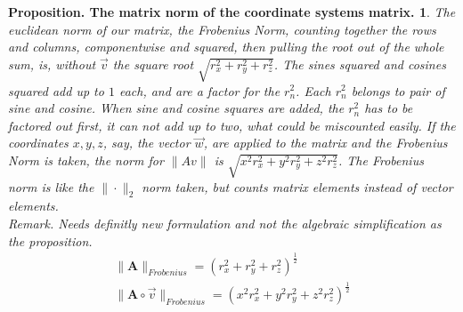 \documentclass[a4paper]{article}
\begin{document}
\newtheorem{PropositionMatrixNorm}{Proposition. The matrix norm of the coordinate systems matrix.}
\begin{PropositionMatrixNorm}
\label{proposition_matrix_norm}
The euclidean norm of our matrix, the Frobenius Norm, counting together the rows and columns, componentwise and squared, then pulling the root out of the whole sum, is, without $\vec{v}$ the square root $\sqrt{r_{x}^{2}+r_{y}^{2}+r_{z}^{2}}$. The sines squared and cosines squared add up to $1$ each, and are a factor for the $r_{n}^{2}$. Each $r_{n}^{2}$ belongs to pair of sine and cosine. When sine and cosine squares are added, the $r_{n}^{2}$ has to be factored out first, it can not add up to two, what could be miscounted easily. If the coordinates $x,y,z$, say, the vector $\vec{w}$, are applied to the matrix and the Frobenius Norm is taken, the norm for $\|Av\|$ is $\sqrt{x^{2}r_{x}^{2}+y^{2}r_{y}^{2}+z^{2}r_{z}^{2}}$. The Frobenius norm is like the $\|\cdot\|_{2}$ norm taken, but counts matrix elements instead of vector elements.\\

Remark. Needs definitly new formulation and not the algebraic simplification as the proposition.\\

\begin{displaymath}
\begin{align}
\|\boldsymbol{A}\|_{Frobenius} = (r_{x}^{2}+r_{y}^{2}+r_{z}^{2})^{\frac{1}{2}}\\
\|\boldsymbol{A}\circ\vec{v}\|_{Frobenius} = (x^{2}r_{x}^{2}+y^{2}r_{y}^{2}+z^{2}r_{z}^{2})^{\frac{1}{2}}
\end{align}
\end{displaymath}
\end{PropositionMatrixNorm}
\end{document}
